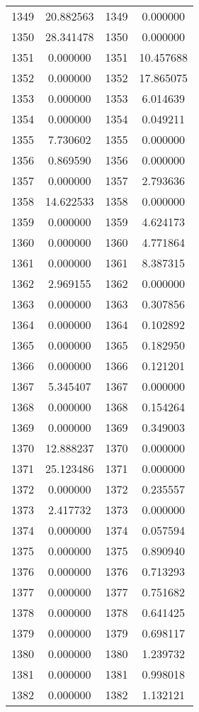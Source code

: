\documentclass[12pt]{article}
\begin{document}
\begin{longtable}{@{}cccc@{}}
1349 & 20.882563 & 1349 & 0.000000 \\
1350 & 28.341478 & 1350 & 0.000000 \\
1351 & 0.000000 & 1351 & 10.457688 \\
1352 & 0.000000 & 1352 & 17.865075 \\
1353 & 0.000000 & 1353 & 6.014639 \\
1354 & 0.000000 & 1354 & 0.049211 \\
1355 & 7.730602 & 1355 & 0.000000 \\
1356 & 0.869590 & 1356 & 0.000000 \\
1357 & 0.000000 & 1357 & 2.793636 \\
1358 & 14.622533 & 1358 & 0.000000 \\
1359 & 0.000000 & 1359 & 4.624173 \\
1360 & 0.000000 & 1360 & 4.771864 \\
1361 & 0.000000 & 1361 & 8.387315 \\
1362 & 2.969155 & 1362 & 0.000000 \\
1363 & 0.000000 & 1363 & 0.307856 \\
1364 & 0.000000 & 1364 & 0.102892 \\
1365 & 0.000000 & 1365 & 0.182950 \\
1366 & 0.000000 & 1366 & 0.121201 \\
1367 & 5.345407 & 1367 & 0.000000 \\
1368 & 0.000000 & 1368 & 0.154264 \\
1369 & 0.000000 & 1369 & 0.349003 \\
1370 & 12.888237 & 1370 & 0.000000 \\
1371 & 25.123486 & 1371 & 0.000000 \\
1372 & 0.000000 & 1372 & 0.235557 \\
1373 & 2.417732 & 1373 & 0.000000 \\
1374 & 0.000000 & 1374 & 0.057594 \\
1375 & 0.000000 & 1375 & 0.890940 \\
1376 & 0.000000 & 1376 & 0.713293 \\
1377 & 0.000000 & 1377 & 0.751682 \\
1378 & 0.000000 & 1378 & 0.641425 \\
1379 & 0.000000 & 1379 & 0.698117 \\
1380 & 0.000000 & 1380 & 1.239732 \\
1381 & 0.000000 & 1381 & 0.998018 \\
1382 & 0.000000 & 1382 & 1.132121 \\

\end{longtable}
\end{document}
